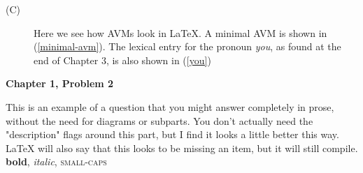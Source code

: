 \documentclass{article}
\begin{document}
\begin{description}
    \item[(C)] Here we see how AVMs look in LaTeX. A minimal AVM is shown in (\ref{minimal-avm}). The lexical entry for the pronoun \textit{you}, as found at the end of Chapter 3, is also shown in (\ref{you})
    

\end{description}

\newpage

\textbf{\Large Chapter 1, Problem 2}
\begin{description}
This is an example of a question that you might answer completely in prose, without the need for diagrams or subparts. You don't actually need the "description" flags around this part, but I find it looks a little better this way. LaTeX will also say that this looks to be missing an item, but it will still compile. \textbf{bold}, \textit{italic}, \textsc{small-caps}
\end{description}
\end{document}

